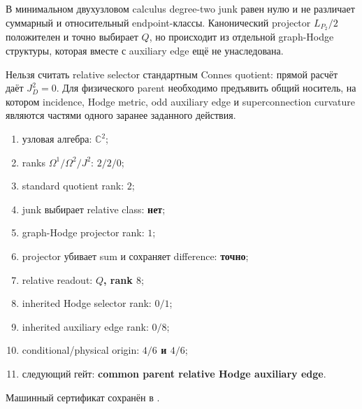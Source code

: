 \begin{theorem}
В минимальном двухузловом calculus degree-two junk равен нулю и не
различает суммарный и относительный endpoint-классы. Канонический projector
$L_{P_2}/2$ положителен и точно выбирает $Q$, но происходит из отдельной
graph-Hodge структуры, которая вместе с auxiliary edge ещё не унаследована.
\end{theorem}

\begin{nogocriterion}
Нельзя считать relative selector стандартным Connes quotient: прямой
расчёт даёт $J_D^2=0$. Для физического parent необходимо предъявить общий
носитель, на котором incidence, Hodge metric, odd auxiliary edge и
superconnection curvature являются частями одного заранее заданного
действия.
\end{nogocriterion}

\begin{protocol}\begin{enumerate}
\item узловая алгебра: \textbf{$\mathbb C^2$};
\item ranks $\Omega^1/\Omega^2/J^2$: \textbf{$2/2/0$};
\item standard quotient rank: \textbf{$2$};
\item junk выбирает relative class: \textbf{нет};
\item graph-Hodge projector rank: \textbf{$1$};
\item projector убивает sum и сохраняет difference: \textbf{точно};
\item relative readout: \textbf{$Q$, rank $8$};
\item inherited Hodge selector rank: \textbf{$0/1$};
\item inherited auxiliary edge rank: \textbf{$0/8$};
\item conditional/physical origin: \textbf{$4/6$ и $4/6$};
\item следующий гейт: \textbf{common parent relative Hodge auxiliary edge}.
\end{enumerate}\end{protocol}

Машинный сертификат сохранён в
.